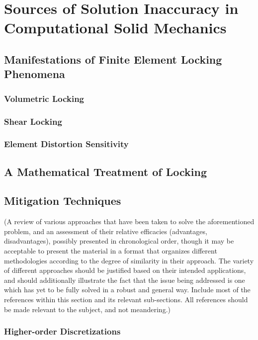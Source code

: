 \chapter{Sources of Solution Inaccuracy in Computational Solid Mechanics}
%
\section{Manifestations of Finite Element Locking Phenomena}

\subsection{Volumetric Locking}

\subsection{Shear Locking}

\subsection{Element Distortion Sensitivity}

\section{A Mathematical Treatment of Locking}

\section{Mitigation Techniques}

(A review of various approaches that have been taken to solve the aforementioned problem, and an assessment of their relative efficacies (advantages, disadvantages), possibly presented in chronological order, though it may be acceptable to present the material in a format that organizes different methodologies according to the degree of similarity in their approach. The variety of different approaches should be justified based on their intended applications, and should additionally illustrate the fact that the issue being addressed is one which has yet to be fully solved in a robust and general way. Include most of the references within this section and its relevant sub-sections. All references should be made relevant to the subject, and not meandering.)

\subsection{Higher-order Discretizations}

